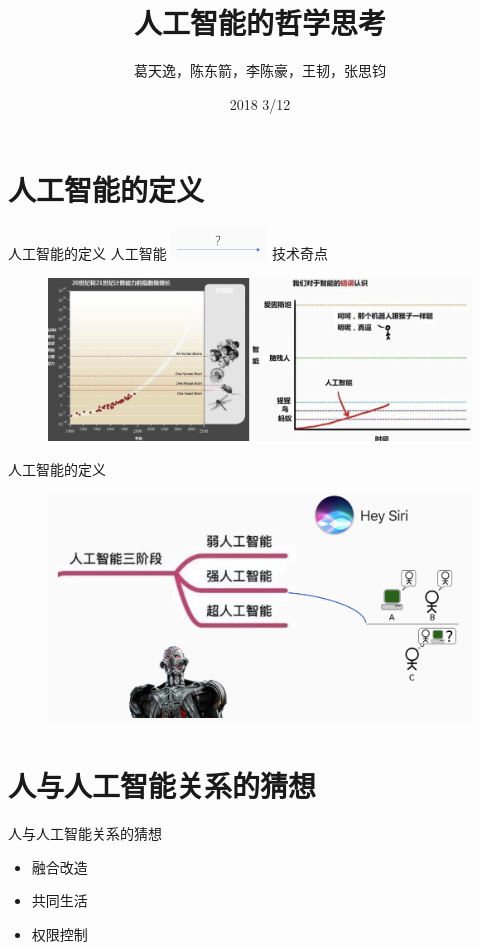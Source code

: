 \documentclass{beamer}
\title{人工智能的哲学思考}
\date{2018 3/12}
\author{葛天逸，陈东箭，李陈豪，王韧，张思钧}
\institute{马克思主义基本原理概论课堂讨论}
\begin{document}
  \maketitle
  \tableofcontents

  \section{人工智能的定义}
  \begin{frame}{人工智能的定义}
    人工智能    \includegraphics[width=1in]{qfbPic1} 技术奇点

   \begin{figure}[H]
   \centering
    \includegraphics[width=4.5in]{qfbPic2.jpg}
   \end{figure}

  \end{frame}

  \begin{frame}{人工智能的定义}
     \begin{figure}[H]
   \centering
    \includegraphics[width=4.5in]{qfbPic3.jpg}
   \end{figure}
  \end{frame}

  \section{人与人工智能关系的猜想}
  \begin{frame}{人与人工智能关系的猜想}
    \begin{itemize}
     \item 融合改造
     \item 共同生活
     \item 权限控制
    \end{itemize}
  \end{frame}
\end{document}
